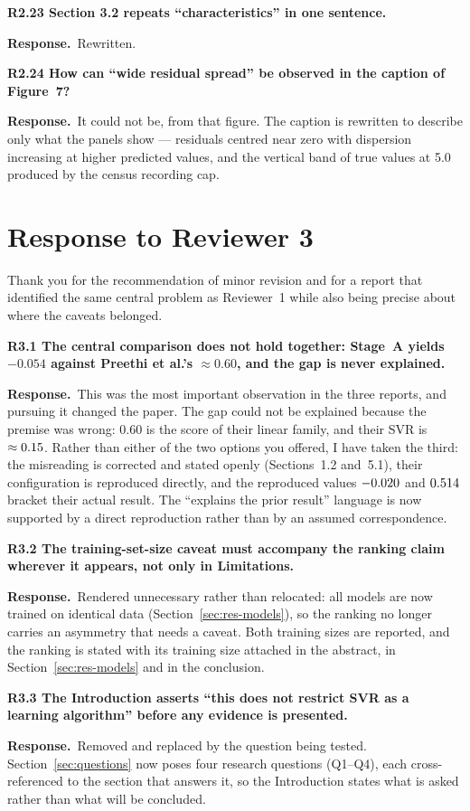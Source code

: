 \documentclass[11pt,a4paper]{article}
\newcommand{\reply}{\par\noindent\textbf{Response.}\ }
\newcommand{\pt}[1]{\par\medskip\noindent\textbf{#1}\par}
\begin{document}
\pt{R2.23 Section 3.2 repeats ``characteristics'' in one sentence.}
\reply Rewritten.

\pt{R2.24 How can ``wide residual spread'' be observed in the caption of Figure~7?}
\reply It could not be, from that figure. The caption is rewritten to describe only what the
panels show --- residuals centred near zero with dispersion increasing at higher predicted
values, and the vertical band of true values at 5.0 produced by the census recording cap.

\section{Response to Reviewer 3}

Thank you for the recommendation of minor revision and for a report that identified the same
central problem as Reviewer~1 while also being precise about where the caveats belonged.

\pt{R3.1 The central comparison does not hold together: Stage~A yields $-0.054$ against
Preethi et al.'s $\approx 0.60$, and the gap is never explained.}
\reply This was the most important observation in the three reports, and pursuing it changed
the paper. The gap could not be explained because the premise was wrong: $0.60$ is the score
of their linear family, and their SVR is $\approx 0.15$. Rather than either
of the two options you offered, I have taken the third: the misreading is corrected and
stated openly (Sections~1.2 and~5.1), their configuration is reproduced directly, and the
reproduced values $-0.020$ and $0.514$ bracket their actual result.
The ``explains the prior result'' language is now supported by a direct reproduction rather
than by an assumed correspondence.

\pt{R3.2 The training-set-size caveat must accompany the ranking claim wherever it appears,
not only in Limitations.}
\reply Rendered unnecessary rather than relocated: all \NModels{} models are now trained on
identical data (Section~\ref{sec:res-models}), so the ranking no longer carries an asymmetry that needs a
caveat. Both training sizes are reported, and the ranking is stated with its training size
attached in the abstract, in Section~\ref{sec:res-models} and in the conclusion.

\pt{R3.3 The Introduction asserts ``this does not restrict SVR as a learning algorithm''
before any evidence is presented.}
\reply Removed and replaced by the question being tested. Section~\ref{sec:questions} now poses four
research questions (Q1--Q4), each cross-referenced to the section that answers it, so the
Introduction states what is asked rather than what will be concluded.
\end{document}
